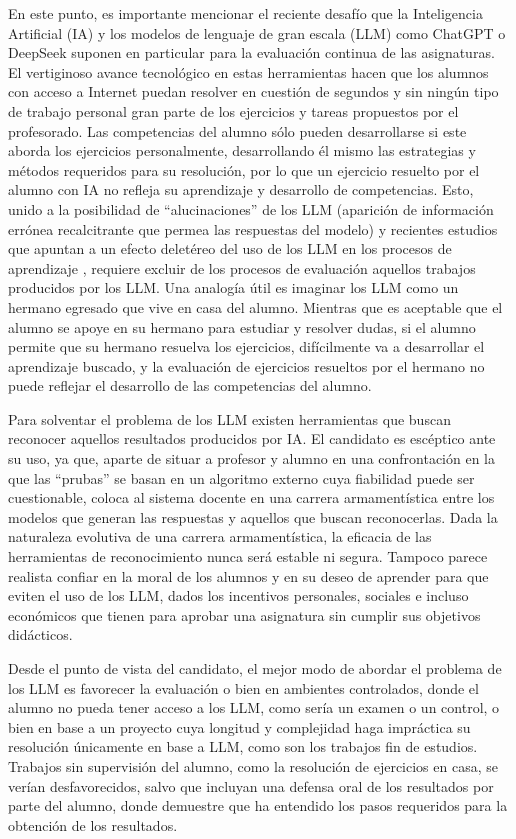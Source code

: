 \documentclass[a4paper,12pt,twoside]{article}
\begin{document}
En este punto, es importante mencionar el reciente desafío que la Inteligencia Artificial (IA) y los modelos de lenguaje de gran escala (LLM) como ChatGPT o DeepSeek suponen en particular para la evaluación continua de las asignaturas. El vertiginoso avance tecnológico en estas herramientas hacen que los alumnos con acceso a Internet puedan resolver en cuestión de segundos y sin ningún tipo de trabajo personal gran parte de los ejercicios y tareas propuestos por el profesorado. Las competencias del alumno sólo pueden desarrollarse si este aborda los ejercicios personalmente, desarrollando él mismo las estrategias y métodos requeridos para su resolución, por lo que un ejercicio resuelto por el alumno con IA no refleja su aprendizaje y desarrollo de competencias. Esto, unido a la posibilidad de ``alucinaciones'' de los LLM (aparición de información errónea recalcitrante que permea las respuestas del modelo) y recientes estudios que apuntan a un efecto deletéreo del uso de los LLM en los procesos de aprendizaje \cite{ZhaiAI,JUAI}, requiere excluir de los procesos de evaluación aquellos trabajos producidos por los LLM. Una analogía útil es imaginar los LLM como un hermano egresado que vive en casa del alumno. Mientras que es aceptable que el alumno se apoye en su hermano para estudiar y resolver dudas, si el alumno permite que su hermano resuelva los ejercicios, difícilmente va a desarrollar el aprendizaje buscado, y la evaluación de ejercicios resueltos por el hermano no puede reflejar el desarrollo de las competencias del alumno.

Para solventar el problema de los LLM existen herramientas que buscan reconocer aquellos resultados producidos por IA. El candidato es escéptico ante su uso, ya que, aparte de situar a profesor y alumno  en una confrontación en la que las ``prubas'' se basan en un algoritmo externo cuya fiabilidad puede ser cuestionable, coloca al sistema docente en una carrera armamentística entre los modelos que generan las respuestas y aquellos que buscan reconocerlas. Dada la naturaleza evolutiva de una carrera armamentística, la eficacia de las herramientas de reconocimiento nunca será estable ni segura. Tampoco parece realista confiar en la moral de los alumnos y en su deseo de aprender para que eviten el uso de los LLM, dados los incentivos personales, sociales e incluso económicos que tienen para aprobar una asignatura sin cumplir sus objetivos didácticos.

Desde el punto de vista del candidato, el mejor modo de abordar el problema de los LLM es favorecer la evaluación o bien en ambientes controlados, donde el alumno no pueda tener acceso a los LLM, como sería un examen o un control, o bien en base a un proyecto cuya longitud y complejidad haga impráctica su resolución únicamente en base a LLM, como son los trabajos fin de estudios. Trabajos sin supervisión del alumno, como la resolución de ejercicios en casa, se verían desfavorecidos, salvo que incluyan una defensa oral de los resultados por parte del alumno, donde demuestre que ha entendido los pasos requeridos para la obtención de los resultados.
\end{document}
